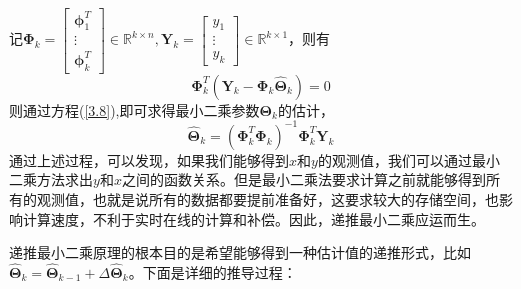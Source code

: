 记$\symbf{\Phi}_{k}=\left[\begin{matrix}\symbf{\phi}_{1}^{T} \\ \vdots \\ \symbf{\phi}_{k}^{T}\end{matrix}\right] \in \mathbb{R}^{k \times n}, \symbf{Y}_{k}=\left[\begin{matrix}y_{1} \\ \vdots \\ y_{k}\end{matrix}\right] \in \mathbb{R}^{k \times 1}$，则有
\begin{equation}
\label{3.8}
\symbf{\Phi}_{k}^{T}\left(\symbf{Y}_{k}-\symbf{\Phi}_{k} \hat{\symbf{\Theta}}_{k}\right)=0
\end{equation}
则通过方程(\ref{3.8}),即可求得最小二乘参数$\symbf{\Theta}_k$的估计，
\begin{equation}
\label{3.9}
\hat{\symbf{\Theta}}_{k}=\left(\symbf{\Phi}_{k}^{T} \symbf{\Phi}_{k}\right)^{-1} \symbf{\Phi}_{k}^{T} \symbf{Y}_{k}
\end{equation}
通过上述过程，可以发现，如果我们能够得到$x$和$y$的观测值，我们可以通过最小二乘方法求出$y$和$x$之间的函数关系。但是最小二乘法要求计算之前就能够得到所有的观测值，也就是说所有的数据都要提前准备好，这要求较大的存储空间，也影响计算速度，不利于实时在线的计算和补偿。因此，递推最小二乘应运而生。

递推最小二乘原理的根本目的是希望能够得到一种估计值的递推形式，比如$\hat{\symbf{\Theta}}_k=\hat{\symbf{\Theta}}_{k-1}+\Delta\hat{\symbf{\Theta}}_k$。下面是详细的推导过程：

